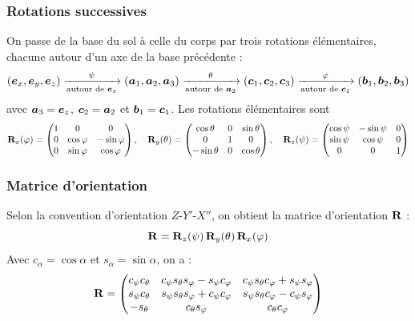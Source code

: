 \subsubsection{Rotations successives}

On passe de la base du sol à celle du corps par trois rotations
élémentaires, chacune autour d'un axe de la base précédente :
\[
    (\bm{e}_x,\bm{e}_y,\bm{e}_z)
    \xrightarrow[\text{autour de } \bm{e}_z]{\psi}
    (\bm{a}_1,\bm{a}_2,\bm{a}_3)
    \xrightarrow[\text{autour de } \bm{a}_2]{\theta}
    (\bm{c}_1,\bm{c}_2,\bm{c}_3)
    \xrightarrow[\text{autour de } \bm{c}_1]{\varphi}
    (\bm{b}_1,\bm{b}_2,\bm{b}_3)
\]
avec $\bm{a}_3 = \bm{e}_z$, $\bm{c}_2 = \bm{a}_2$ et
$\bm{b}_1 = \bm{c}_1$. Les rotations élémentaires sont
\[
    \mathbf{R}_x(\varphi) = \begin{pmatrix}
        1 & 0 & 0\\
        0 & \cos\varphi & -\sin\varphi\\
        0 & \sin\varphi & \cos\varphi
    \end{pmatrix},
    \quad
    \mathbf{R}_y(\theta) = \begin{pmatrix}
        \cos\theta & 0 & \sin\theta\\
        0 & 1 & 0\\
        -\sin\theta & 0 & \cos\theta
    \end{pmatrix},
    \quad
    \mathbf{R}_z(\psi) = \begin{pmatrix}
        \cos\psi & -\sin\psi & 0\\
        \sin\psi & \cos\psi & 0\\
        0 & 0 & 1
    \end{pmatrix}
\]

\subsubsection{Matrice d'orientation}

Selon la convention d'orientation $Z$-$Y'$-$X''$, on obtient la matrice d'orientation 
$\mathbf{R}$ : 
\[
    \mathbf{R} = \mathbf{R}_z(\psi)\,\mathbf{R}_y(\theta)\,\mathbf{R}_x(\varphi)
\]
Avec $c_\alpha = \cos\alpha$ et
$s_\alpha = \sin\alpha$, on a :
\[
    \mathbf{R} = \begin{pmatrix}
        c_\psi c_\theta
            & c_\psi s_\theta s_\varphi - s_\psi c_\varphi
            & c_\psi s_\theta c_\varphi + s_\psi s_\varphi\\
        s_\psi c_\theta
            & s_\psi s_\theta s_\varphi + c_\psi c_\varphi
            & s_\psi s_\theta c_\varphi - c_\psi s_\varphi\\
        -s_\theta & c_\theta s_\varphi & c_\theta c_\varphi
    \end{pmatrix}
\]

